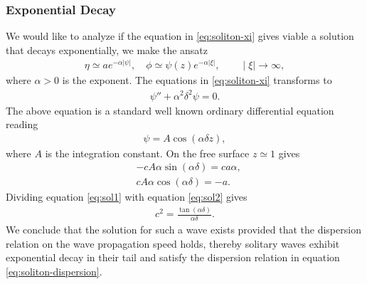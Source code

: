 \subsubsection{Exponential Decay}
We would like to analyze if the equation in \ref{eq:soliton-xi} gives viable a
solution that decays exponentially, we make the ansatz
\begin{align}
    \eta \simeq a e^{-\alpha |\psi|},\quad \phi \simeq \psi(z)e^{-\alpha
    |\xi|}, \qquad  \mid \xi \mid \rightarrow \infty,
\end{align}
where $\alpha>0$ is the exponent. The equations in \ref{eq:soliton-xi}
transforms to
\begin{align}
    \psi'' + \alpha^2 \delta^2\psi = 0.
\end{align}
The above equation is a standard well known ordinary differential equation
reading
\begin{align}
    \psi = A \cos(\alpha\delta z),
\end{align}
where $A$ is the integration constant. On the free surface $z\simeq 1$ gives
\begin{align}
    &-cA\alpha\sin(\alpha\delta) = ca\alpha,\label{eq:sol1}\\
    &cA\alpha \cos(\alpha\delta) = -a \label{eq:sol2}.
\end{align}
Dividing equation \ref{eq:sol1} with equation \ref{eq:sol2} gives
\begin{align} \label{eq:soliton-dispersion}
    c^2 = \frac{\tan\left(\alpha\delta  \right) }{\alpha\delta}.
\end{align}
We conclude that the solution for such a wave exists provided that the
dispersion relation on the wave propagation speed holds, thereby solitary
waves exhibit exponential decay in their tail and satisfy the dispersion
relation in equation \ref{eq:soliton-dispersion}.
